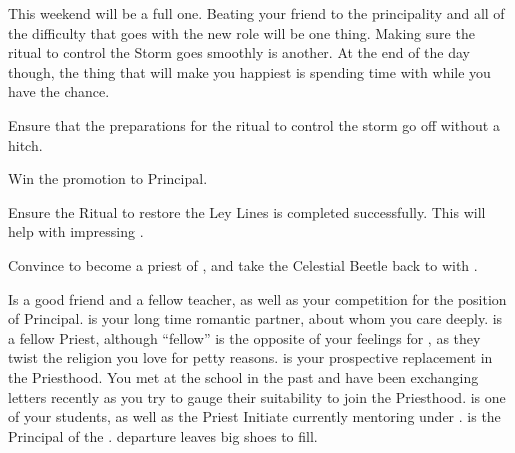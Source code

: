 \documentclass[char]{GL2020}
\begin{document}
This weekend will be a full one. Beating your friend \cMusic{} to the principality and all of the difficulty that goes with the new role will be one thing. Making sure the ritual to control the Storm goes smoothly is another.  At the end of the day though, the thing that will make you happiest is spending time with \cJuniorStatesman{} while you have the chance. 


\begin{itemz}[Goals]
	\item Ensure that the preparations for the ritual to control the storm go off without a hitch.
	\item Win the promotion to Principal.
	\item Ensure the Ritual to restore the Ley Lines is completed successfully. This will help with impressing \cPrincipal{}.
	\item Convince \cHeadScientist{} to become a priest of \cTechGod{}, and take the Celestial Beetle back to \pTech{} with \cHeadScientist{\them}.
\end{itemz}

\begin{itemz}[Notes]
	\item 
\end{itemz}

\begin{contacts}
	\contact{\cMusic{}} Is a good friend and a fellow teacher, as well as your competition for the position of Principal.
	\contact{\cJuniorStatesman{}} is your long time romantic partner, about whom you care deeply.
	\contact{\cAntiChup{}} is a fellow Priest, although “fellow” is the opposite of your feelings for \cAntiChup{\them}, as they twist the religion you love for petty reasons.
	\contact{\cHeadScientist{}} is your prospective replacement in the Priesthood. You met at the school in the past and have been exchanging letters recently as you try to gauge their suitability to join the Priesthood.
	\contact{\cScholarship{}} is one of your students, as well as the Priest Initiate currently mentoring under \cAntiChup{}.  
	\contact{\cPrincipal{}} is the Principal of the \pSchool{}. \cPrincipal{\their} departure leaves big shoes to fill.
\end{contacts}
\end{document}
